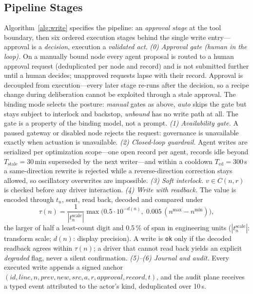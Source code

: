 \subsection{Pipeline Stages}
Algorithm~\ref{alg:write} specifies the pipeline: an \emph{approval stage} at the tool boundary, then six ordered execution stages behind the single write entry---approval is a \emph{decision}, execution a \emph{validated act}.
\emph{(0) Approval gate (human in the loop).} On a manually bound node every agent proposal is routed to a human approval request (deduplicated per node and record) and is not submitted further until a human decides; unapproved requests lapse with their record. Approval is decoupled from execution---every later stage re-runs after the decision, so a recipe change during deliberation cannot be exploited through a stale approval. The binding mode selects the posture: \emph{manual} gates as above, \emph{auto} skips the gate but stays subject to interlock and backstop, \emph{unbound} has no write path at all. The gate is a property of the binding model, not a prompt.
\emph{(1) Availability gate.} A paused gateway or disabled node rejects the request: governance is unavailable exactly when actuation is unavailable.
\emph{(2) Closed-loop guardrail.} Agent writes are serialized per optimization scope---one open record per agent, records idle beyond $T_{\text{stale}} = 30$\,min superseded by the next writer---and within a cooldown $T_{\text{cd}} = 300$\,s a same-direction rewrite is rejected while a reverse-direction correction stays allowed, so oscillatory overwrites are impossible.
\emph{(3) Soft interlock.} $v \in C(n, r)$ is checked before any driver interaction.
\emph{(4) Write with readback.} The value is encoded through $t_n$, sent, read back, decoded and compared under
\begin{equation}
\tau(n) = \frac{1}{|t_n^{\text{scale}}|}\max\!\big(0.5 \cdot 10^{-d(n)},\; 0.005\,(n^{\max} - n^{\min})\big),
\label{eq:tolerance}
\end{equation}
the larger of half a least-count digit and 0.5\,\% of span in engineering units ($|t_n^{\text{scale}}|$: transform scale; $d(n)$: display precision). A write is \texttt{ok} only if the decoded readback agrees within $\tau(n)$; a driver that cannot read back yields an explicit \emph{degraded} flag, never a silent confirmation.
\emph{(5)--(6) Journal and audit.} Every executed write appends a signed anchor $(id, line, n, prev, new, \textit{src}, a, r, \textit{approval}, \textit{record}, t)$, and the audit plane receives a typed event attributed to the actor's kind, deduplicated over 10\,s.

